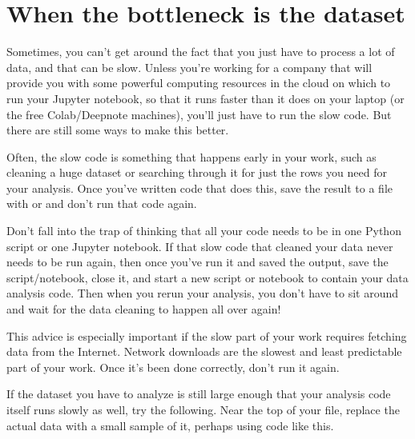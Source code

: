 \documentclass[letterpaper,10pt,english]{jupyterBook}
\begin{document}
\section{When the bottleneck is the dataset}
\label{\detokenize{chapter-11-processing-rows:when-the-bottleneck-is-the-dataset}}
\sphinxAtStartPar
Sometimes, you can’t get around the fact that you just have to process a lot of data, and that can be slow.  Unless you’re working for a company that will provide you with some powerful computing resources in the cloud on which to run your Jupyter notebook, so that it runs faster than it does on your laptop (or the free Colab/Deepnote machines), you’ll just have to run the slow code.  But there are still some ways to make this better.

\sphinxAtStartPar
{}  Often, the slow code is something that happens early in your work, such as cleaning a huge dataset or searching through it for just the rows you need for your analysis.  Once you’ve written code that does this, save the result to a file with  or  and don’t run that code again.

\sphinxAtStartPar
Don’t fall into the trap of thinking that all your code needs to be in one Python script or one Jupyter notebook.  If that slow code that cleaned your data never needs to be run again, then once you’ve run it and saved the output, save the script/notebook, close it, and start a new script or notebook to contain your data analysis code.  Then when you re\sphinxhyphen{}run your analysis, you don’t have to sit around and wait for the data cleaning to happen all over again!

\sphinxAtStartPar
This advice is especially important if the slow part of your work requires fetching data from the Internet.  Network downloads are the slowest and least predictable part of your work.  Once it’s been done correctly, don’t run it again.

\sphinxAtStartPar
{}  If the dataset you have to analyze is still large enough that your analysis code itself runs slowly as well, try the following.  Near the top of your file, replace the actual data with a small sample of it, perhaps using code like this.

\begin{sphinxVerbatim}[commandchars=\\\{\}]
    
\end{sphinxVerbatim}
\end{document}
